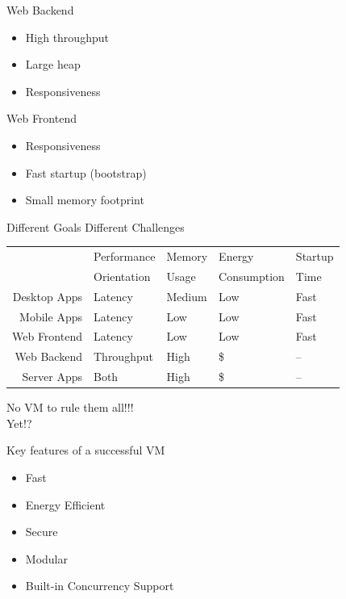 \documentclass[
14pt,
aspectratio=169,
usenames,
dvipsnames,
x11names]{beamer}
\begin{document}
\begin{frame}{Web Backend}
  \begin{itemize}  \setlength{\itemsep}{\fill}
  \item High throughput
  \item Large heap
  \item Responsiveness
  \end{itemize}
\end{frame}

\begin{frame}{Web Frontend}
  \begin{itemize}  \setlength{\itemsep}{\fill}
  \item Responsiveness
  \item Fast startup (bootstrap)
  \item Small memory footprint
  \end{itemize}
\end{frame}

\begin{frame}{Different Goals Different Challenges}
  \centering
  \begin{tabular}{r | l l l l}
                 & Performance & Memory & Energy      & Startup \\
                 & Orientation & Usage  & Consumption & Time    \\
    \hline
    Desktop Apps & Latency     & Medium & Low         & Fast    \\
    Mobile Apps  & Latency     & Low    & Low         & Fast    \\
    Web Frontend & Latency     & Low    & Low         & Fast    \\
    Web Backend  & Throughput  & High   & \$          & --      \\
    Server Apps  & Both        & High   & \$          & --      \\
  \end{tabular}
\end{frame}

\begin{frame}
  \centering
  {No VM to rule them all!!!}\\
  \pause Yet!?
\end{frame}

\begin{frame}{Key features of a successful VM}
  \begin{itemize}  \setlength{\itemsep}{\fill}
  \item Fast
  \item Energy Efficient
  \item Secure
  \item Modular
  \item Built-in Concurrency Support
  \end{itemize}
\end{frame}
\end{document}
